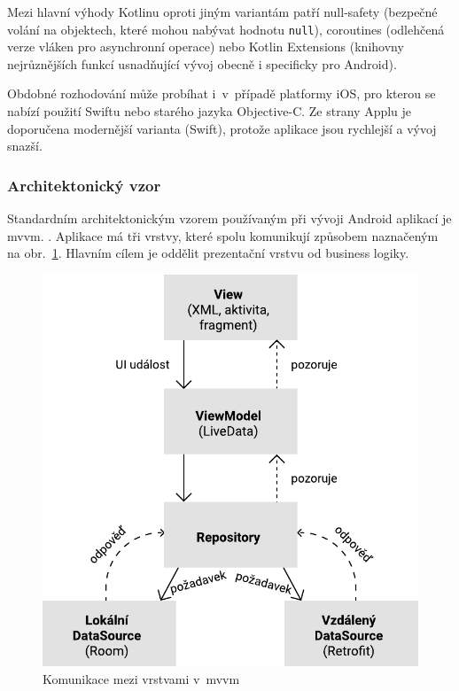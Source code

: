 \documentclass[twoside]{ctuthesis}
\begin{document}
Mezi hlavní výhody Kotlinu oproti jiným variantám patří null-safety (bezpečné volání na objektech, které mohou nabývat hodnotu \texttt{null}), coroutines (odlehčená verze vláken pro asynchronní operace) nebo Kotlin Extensions (knihovny nejrůznějších funkcí usnadňující vývoj obecně i specificky pro Android). \cite{android2021kotlin}

Obdobné rozhodování může probíhat i~v~případě platformy iOS, pro kterou se nabízí použití Swiftu nebo starého jazyka Objective-C. Ze strany Applu je doporučena modernější varianta (Swift), protože aplikace jsou rychlejší a vývoj snazší.

\subsubsection{Architektonický vzor}
Standardním architektonickým vzorem používaným při vývoji Android aplikací je \acrshort{mvvm}. \cite{android2020guide}. Aplikace má tři vrstvy, které spolu komunikují způsobem naznačeným na obr.~\ref{fig:mvvm}. Hlavním cílem je oddělit prezentační vrstvu od business logiky.  \cite{shekhar2020mvvm}

\begin{figure}[h!]
	\includegraphics[scale=0.7]{img/mvvm-architecture.pdf}
	\caption{Komunikace mezi vrstvami v~\acrshort{mvvm}}
	\label{fig:mvvm}
\end{figure}
\end{document}
